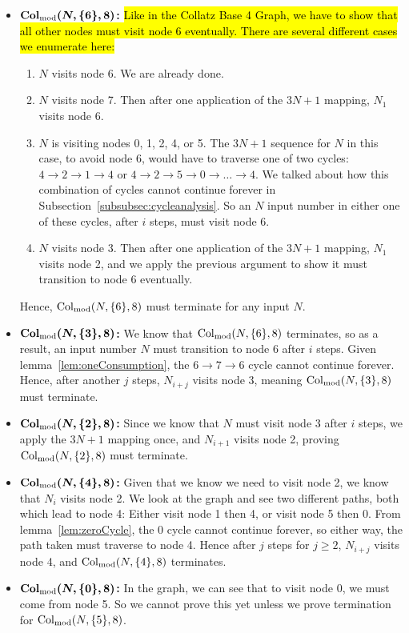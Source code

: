 \begin{itemize}
    \item \textbf{$\boldsymbol{\mathrm{Col}_{\text{mod}}(N,\{6\},8)}$:} \hl{Like in the Collatz Base 4 Graph, we have to show that all other nodes must visit node 6 eventually. There are several different cases we enumerate here:}
\begin{enumerate}
\item $N$ visits node 6. We are already done.
\item $N$ visits node 7. Then after one application of the $3N+1$ mapping, $N_1$ visits node 6.
\item $N$ is visiting nodes 0, 1, 2, 4, or 5. The $3N+1$ sequence for $N$ in this case, to avoid node 6, would have to traverse one of two cycles: $4 \rightarrow 2 \rightarrow 1 \rightarrow 4$ or $4 \rightarrow 2 \rightarrow 5 \rightarrow 0 \rightarrow \ldots \rightarrow 4$.  We talked about how this combination of cycles cannot continue forever in Subsection~\ref{subsubsec:cycleanalysis}. So an $N$ input number in either one of these cycles, after $i$ steps, must visit node 6.
\item $N$ visits node 3. Then after one application of the $3N+1$ mapping, $N_1$ visits node 2, and we apply the previous argument to show it must transition to node 6 eventually.
\end{enumerate}  
Hence, $\mathrm{Col}_{\text{mod}}(N,\{6\},8)$ must terminate for any input $N$.
    \item \textbf{$\boldsymbol{\mathrm{Col}_{\text{mod}}(N,\{3\},8)}$:} We know that $\mathrm{Col}_{\text{mod}}(N,\{6\},8)$ terminates, so as a result, an input number $N$ must transition to node 6 after $i$ steps. Given lemma~\ref{lem:oneConsumption}, the $6 \rightarrow 7 \rightarrow 6$ cycle cannot continue forever. Hence, after another $j$ steps, $N_{i+j}$ visits node 3, meaning $\mathrm{Col}_{\text{mod}}(N,\{3\},8)$ must terminate.
    \item \textbf{$\boldsymbol{\mathrm{Col}_{\text{mod}}(N,\{2\},8)}$:} Since we know that $N$ must visit node 3 after $i$ steps, we apply the $3N+1$ mapping once, and $N_{i+1}$ visits node 2, proving $\mathrm{Col}_{\text{mod}}(N,\{2\},8)$ must terminate.
    \item \textbf{$\boldsymbol{\mathrm{Col}_{\text{mod}}(N,\{4\},8)}$:} Given that we know we need to visit node 2, we know that $N_i$ visits node 2. We look at the graph and see two different paths, both which lead to node 4: Either visit node 1 then 4, or visit node 5 then 0. From lemma~\ref{lem:zeroCycle}, the 0 cycle cannot continue forever, so either way, the path taken must traverse to node 4. Hence after $j$ steps for $j \geq 2$, $N_{i+j}$ visits node 4, and $\mathrm{Col}_{\text{mod}}(N,\{4\},8)$ terminates.
    \item \textbf{$\boldsymbol{\mathrm{Col}_{\text{mod}}(N,\{0\},8)}$:} In the graph, we can see that to visit node 0, we must come from node 5. So we cannot prove this yet unless we prove termination for $\mathrm{Col}_{\text{mod}}(N,\{5\},8)$.
\end{itemize}
